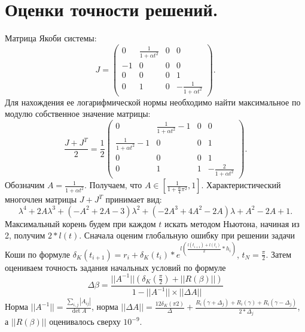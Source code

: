 \documentclass{article}
\begin{document}
\section{Оценки точности решений.}
Матрица Якоби системы:
$$J = \begin{pmatrix}
0 & \frac{1}{1 + \alpha t^{2}} & 0 & 0\\
-1 & 0 & 0 & 0\\
0 & 0 & 0 & 1\\
0 & 1 & 0 & -\frac{1}{1 + \alpha t^{2}}
\end{pmatrix}.$$
Для нахождения ее логарифмической нормы необходимо найти максимальное по модулю собственное значение матрицы:
$$\frac{J + J^{T}}2 = \frac 1 2
\begin{pmatrix}
0 & \frac{1}{1 + \alpha t^{2}}-1 & 0 & 0\\
\frac{1}{1 + \alpha t^{2}}-1 & 0 & 0 & 1\\
0 & 0 & 0 & 1\\
0 & 1 & 1 & -\frac{2}{1 + \alpha t^{2}}
\end{pmatrix}.$$
Обозначим $A = \frac{1}{1 + \alpha t^{2}}$. Получаем, что $A \in [\frac{1}{1 + \frac{\alpha}{4}\pi^{2}}, 1]$.
Характеристический многочлен матрицы $J + J^{T}$ принимает вид:
\[\lambda^{4} + 2A\lambda^{3} + \left(-A^{2} + 2A -3\right)\lambda^{2} + \left(-2A^{3} + 4A^{2} - 2A\right)\lambda + A^{2} - 2A + 1.\]
Максимальный корень будем при каждом $t$ искать методом Ньютона, начиная из 2, получим $2*l(t)$.
Сначала оценим глобальную ошибку при решении задачи Коши по формуле $\delta_{K}(t_{i+1}) = r_{i} + \delta_{K}(t_{i})*e^{l\left(\frac{l(t_{i+1}) + l(t_{i})}{2}*h_{i}\right)}$, $t_{N} = \frac \pi 2$.
Затем оцениваем точность задания начальных условий по формуле
\[\Delta \beta = \frac{||A^{-1}||\left(\delta_{K}\left(\frac \pi 2\right) + ||R(\beta)||\right)}{1 - ||A^{-1}||\times ||\Delta A||}\]
Норма $||A^{-1}|| = \frac{\sum\limits_{i,j}|A_{ij}|}{\det A}$,
норма $||\Delta A|| = \frac{12\delta_{K}(\pi 2)}{\Delta} + \frac{R_{i}(\gamma + \Delta_{j}) + R_{i}(\gamma) + R_{i}(\gamma - \Delta_{j})}{2*\Delta_{j}}$,
а $||R(\beta)||$ оценивалось сверху $10^{-9}$.
\end{document}
